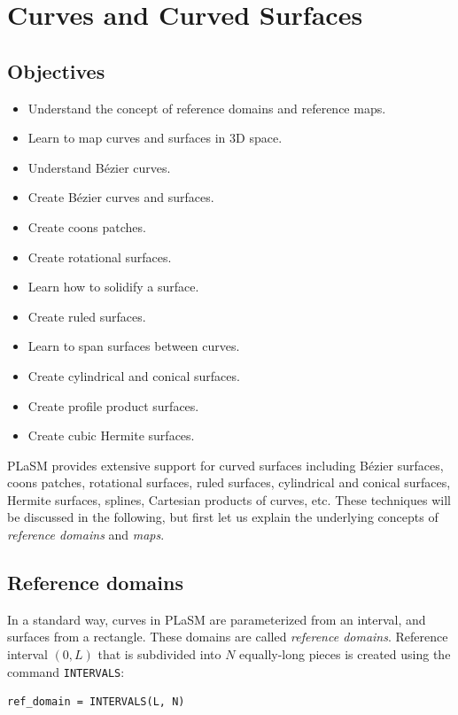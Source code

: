 \section{Curves and Curved Surfaces}\label{sec:curves}

\subsection{Objectives}
\begin{itemize}
\item Understand the concept of reference domains and reference maps.
\item Learn to map curves and surfaces in 3D space.
\item Understand B\'ezier curves.
\item Create B\'ezier curves and surfaces.
\item Create coons patches.
\item Create rotational surfaces.
\item Learn how to solidify a surface.
\item Create ruled surfaces.
\item Learn to span surfaces between curves.
\item Create cylindrical and conical surfaces.
\item Create profile product surfaces.
\item Create cubic Hermite surfaces.
\end{itemize}
PLaSM provides extensive support for curved surfaces including 
B\'ezier surfaces, coons patches, rotational surfaces, ruled surfaces,  
cylindrical and conical surfaces, Hermite surfaces, 
splines, Cartesian products of curves, etc. These techniques will be 
discussed in the following, but first let us explain the underlying 
concepts of {\em reference domains} and {\em maps}.

\subsection{Reference domains}

In a standard way, curves in PLaSM are parameterized from an interval,
and surfaces from a rectangle. These domains are called
{\em reference domains}. 
Reference interval $(0, L)$ that is subdivided into $N$ equally-long pieces is 
created using the command {\tt INTERVALS}:\\

\begin{bbox}
\begin{verbatim}
ref_domain = INTERVALS(L, N)
\end{verbatim}
\end{bbox}
\vspace{6mm}

